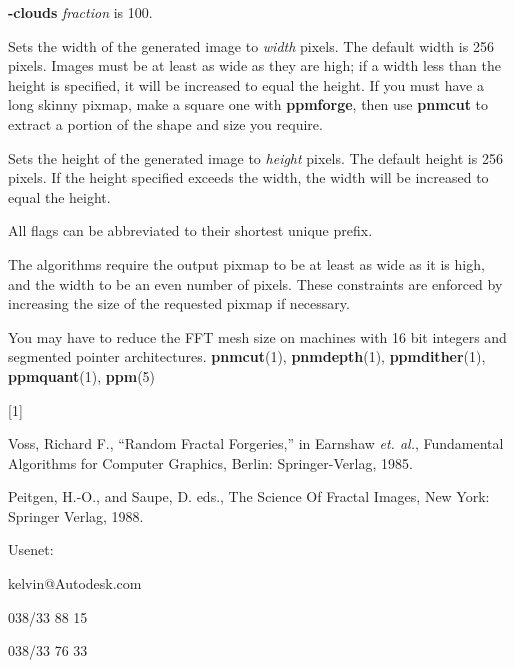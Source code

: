 \begin{TPlist}{{\bf -clouds}}
{\it fraction}
is 100.
\item[{{\bf -xsize$|$-width}{\it \ width}
}]
Sets the width of the generated image to
{\it width}
pixels.  The default width is 256 pixels.  Images must be at least as
wide as they are high; if a width less than the height is specified,
it will be increased to equal the height.  If you must have a long
skinny pixmap, make a square one with
{\bf ppmforge}{\rm ,}
then use
{\bf pnmcut}
to extract a portion of the shape and size you require.
\item[{{\bf -ysize$|$-height}{\it \ height}
}]
Sets the height of the generated image to
{\it height}
pixels.  The default height is 256 pixels.  If the height specified
exceeds the width, the width will be increased to equal the height.
\end{TPlist}

\par
All flags can be abbreviated to their shortest unique prefix.
\par
The algorithms require the output pixmap to be at least as wide as it
is high, and the width to be an even number of pixels.  These
constraints are enforced by increasing the size of the requested
pixmap if necessary.
\par
You may have to reduce the FFT mesh size on machines with 16 bit
integers and segmented pointer architectures.
{\bf pnmcut}{\rm (1),}
{\bf pnmdepth}{\rm (1),}
{\bf ppmdither}{\rm (1),}
{\bf ppmquant}{\rm (1),}
{\bf ppm}{\rm (5)}
\begin{TPlist}{[1] }
\item[{[1] }]
Voss, Richard F., ``Random Fractal Forgeries,'' in Earnshaw
{\it et. al.}, Fundamental Algorithms for Computer Graphics, Berlin:
Springer-Verlag, 1985.
\item[{[2]}]
Peitgen, H.-O., and Saupe, D. eds., The Science Of Fractal Images,
New York: Springer Verlag, 1988.
\end{TPlist}

\begin{TPlist}{Usenet:}
\item[{Usenet:}]
kelvin@Autodesk.com
\item[{Fax:}]
038/33 88 15
\item[{Voice:}]
038/33 76 33
\end{TPlist}

